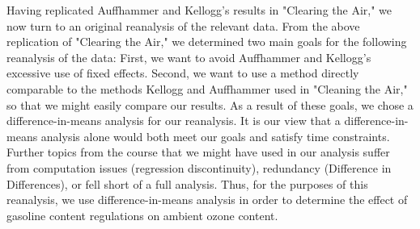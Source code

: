 \documentclass{article}
\begin{document}
Having replicated Auffhammer and Kellogg's results in "Clearing the Air," we now turn to an original reanalysis of the relevant data. From the above replication of "Clearing the Air," we determined two main goals for the following reanalysis of the data: First, we want to avoid Auffhammer and Kellogg's excessive use of fixed effects. Second, we want to use a method directly comparable to the methods Kellogg and Auffhammer used in "Cleaning the Air," so that we might easily compare our results. As a result of these goals, we chose a difference-in-means analysis for our reanalysis. It is our view that a difference-in-means analysis alone would both meet our goals and satisfy time constraints. Further topics from the course that we might have used in our analysis suffer from computation issues (regression discontinuity), redundancy (Difference in Differences), or fell short of a full analysis. Thus, for the purposes of this reanalysis, we use difference-in-means analysis in order to determine the effect of gasoline content regulations on ambient ozone content.
\end{document}
